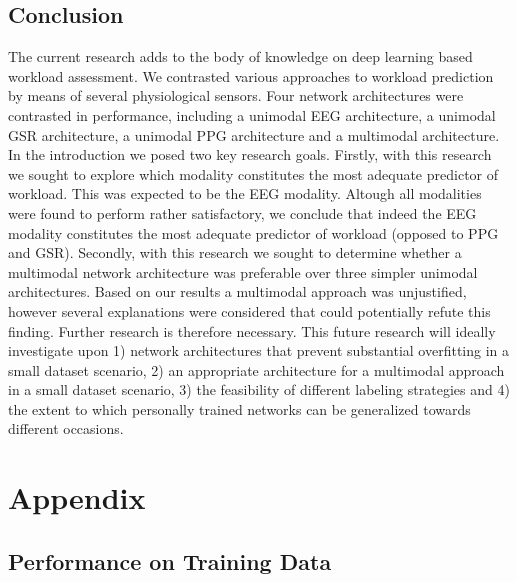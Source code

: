 \documentclass[fleqn,11pt]{paper}
\begin{document}
\subsection{Conclusion}
The current research adds to the body of knowledge on deep learning based workload assessment. We contrasted various approaches to workload prediction by means of several physiological sensors. Four network architectures were contrasted in performance, including a unimodal EEG architecture, a unimodal GSR architecture, a unimodal PPG architecture and a multimodal architecture.  In the introduction we posed two key research goals. Firstly, with this research we sought to explore which modality constitutes the most adequate predictor of workload. This was expected to be the EEG modality. Altough all modalities were found to perform rather satisfactory, we conclude that indeed the EEG modality constitutes the most adequate predictor of workload (opposed to PPG and GSR). Secondly, with this research we sought to determine whether a multimodal network architecture was preferable over three simpler unimodal architectures. Based on our results a multimodal approach was unjustified, however several explanations were considered that could potentially refute this finding. Further research is therefore necessary. This future research will ideally investigate upon 1) network architectures that prevent substantial overfitting in a small dataset scenario,  2) an appropriate architecture for a multimodal approach in a small dataset scenario, 3) the feasibility of different labeling strategies and 4) the extent to which personally trained networks can be generalized towards different occasions.

\newpage



\newpage
\appendix
\section{Appendix} \label{sec:appendix}
\subsection*{Performance on Training Data}
\setcounter{table}{0}    
\end{document}
